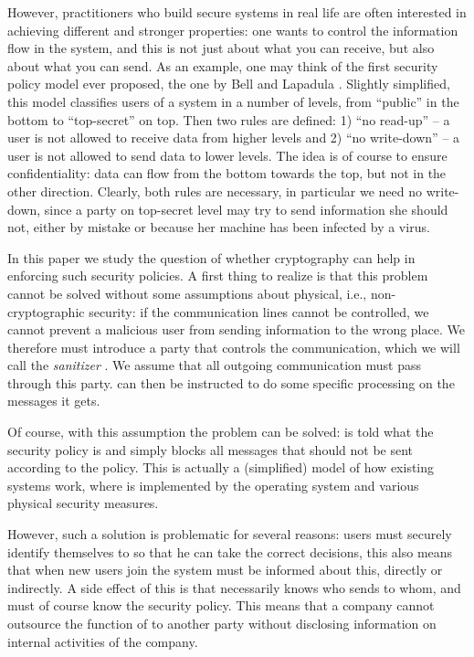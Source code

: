 \documentclass{llncs}
\begin{document}
However, practitioners who build secure systems in real life are often interested in achieving different and 
stronger properties: one wants to control the information flow in the system, and this is not just about 
what you can receive, but also about what you can send. As an example, one may think of the first security 
policy model ever proposed, the one by Bell and Lapadula \cite{lapadula1996secure}. Slightly simplified,  
this model classifies users of a system in a number of levels, from ``public''  in the bottom to 
``top-secret'' on top. Then two rules are defined: 1) ``no read-up'' -- a user is not allowed to receive
 data from higher levels and 2) ``no write-down'' -- a user is not allowed to send data to lower levels. 
 The idea is of course to ensure confidentiality: data can flow from the bottom towards the top, but not in
 the other direction. Clearly, 
both rules are necessary, in particular we need no write-down, since a party on top-secret level may try to 
send information she should not, either by mistake or because her machine has been infected by a virus.

In this paper we study the question of whether cryptography can help in enforcing such security policies.
A first thing to realize is that this problem cannot be solved without some assumptions about physical, 
i.e.,  non-cryptographic security: if the communication lines cannot be controlled, we cannot prevent a 
malicious user 
from sending information to the wrong place. We therefore must introduce a party that controls
the communication, which we will call the 
\emph{sanitizer} . We assume that all outgoing communication must pass through this party. 
 can then be instructed to do some specific processing on the messages it gets.

Of course, with this assumption the problem can be solved:  is told what the security policy is and simply blocks all messages that should not be sent according to the policy. This is actually a (simplified) model of how existing systems work, where  is implemented by the operating system and various physical security measures.

However, such a solution is problematic for several reasons: users must securely identify themselves to
 so that he can take the correct decisions, this also means that when new users join the system
 must be informed about this, directly or indirectly.  A side effect  of this is that  necessarily 
knows who sends to whom, and must of course know the security policy. This means that a company cannot outsource the function of  to  another party without disclosing information on internal activities of the company.
\end{document}

